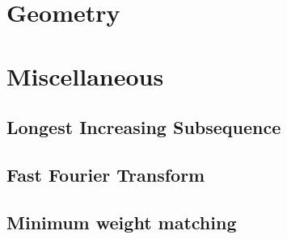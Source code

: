 \documentclass[a4paper,11pt]{article}
\begin{document}
\section{Geometry}
  

\section{Miscellaneous}
  \subsection{Longest Increasing Subsequence}
        
    
  \subsection{Fast Fourier Transform}
    

  \subsection{Minimum weight matching}
    
\end{document}
